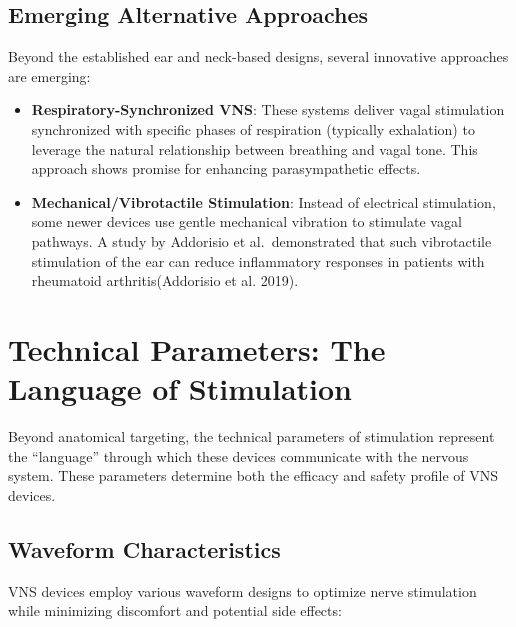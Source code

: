 \documentclass[
  Letterpaper,
]{scrbook}
\begin{document}
\subsection{Emerging Alternative
Approaches}\label{emerging-alternative-approaches}

Beyond the established ear and neck-based designs, several innovative
approaches are emerging:

\begin{itemize}
\item
  \textbf{Respiratory-Synchronized VNS}: These systems deliver vagal
  stimulation synchronized with specific phases of respiration
  (typically exhalation) to leverage the natural relationship between
  breathing and vagal tone. This approach shows promise for enhancing
  parasympathetic effects.
\item
  \textbf{Mechanical/Vibrotactile Stimulation}: Instead of electrical
  stimulation, some newer devices use gentle mechanical vibration to
  stimulate vagal pathways. A study by Addorisio et al.~demonstrated
  that such vibrotactile stimulation of the ear can reduce inflammatory
  responses in patients with rheumatoid arthritis(Addorisio et al.
  2019).
\end{itemize}

\section{Technical Parameters: The Language of
Stimulation}\label{technical-parameters-the-language-of-stimulation}

Beyond anatomical targeting, the technical parameters of stimulation
represent the ``language'' through which these devices communicate with
the nervous system. These parameters determine both the efficacy and
safety profile of VNS devices.

\subsection{Waveform Characteristics}\label{waveform-characteristics}

VNS devices employ various waveform designs to optimize nerve
stimulation while minimizing discomfort and potential side effects:
\end{document}
